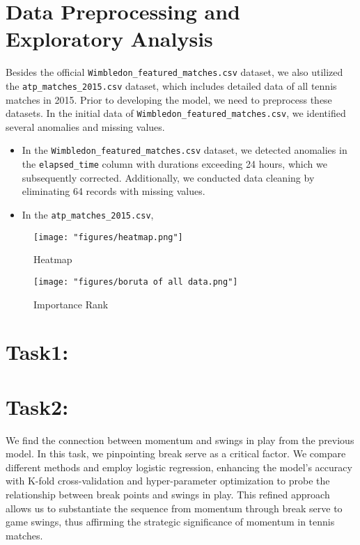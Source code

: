 \documentclass{mcmthesis}
\begin{document}
\section{Data Preprocessing and Exploratory Analysis}

\hspace*{1em} Besides the official \texttt{Wimbledon\_featured\_matches.csv} dataset, %
we also utilized the \texttt{atp\_matches\_2015.csv} dataset, which includes detailed %
data of all tennis matches in 2015. Prior to developing the model, we need to %
preprocess these datasets. In the initial data of \texttt{Wimbledon\_featured\_matches.csv}, %
we identified several anomalies and missing values.
\begin{itemize}
\item In the \texttt{Wimbledon\_featured\_matches.csv} dataset, we detected anomalies in %
the \texttt{elapsed\_time} column with durations exceeding 24 hours, which we subsequently corrected. %
Additionally, we conducted data cleaning by eliminating 64 records with missing values.
\item In the \texttt{atp\_matches\_2015.csv},
\end{itemize}

\begin{figure}[htbp]
\centering
\texttt{[image: "figures/heatmap.png"]}
\caption{Heatmap}
\label{fig:heatmap}
\end{figure}

\begin{figure}[htbp]
\centering
\texttt{[image: "figures/boruta of all data.png"]}
\caption{Importance Rank}
\label{fig:rank}
\end{figure}

\section{Task1: }

\section{Task2: }
We find the connection between momentum and swings in play from the previous model.%
In this task, we pinpointing break serve as a critical factor. We compare different methods and employ logistic regression, %
enhancing the model's accuracy with K-fold cross-validation and hyper-parameter optimization to probe%
 the relationship between break points and swings in play. This refined approach allows%
  us to substantiate the sequence from momentum through break serve to game swings,%
   thus affirming the strategic significance of momentum in tennis matches.
\end{document}
